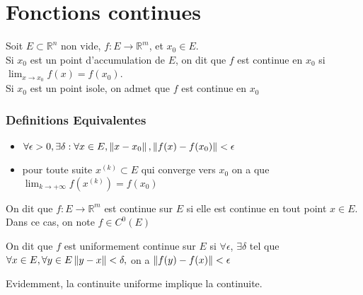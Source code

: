 \documentclass[../main.tex]{subfiles}
\begin{document}
\section{Fonctions continues}
\begin{defn}
	Soit $E \subset \mathbb{R}^n$ non vide, $f: E \to \mathbb{R}^{m}$, et $x_0 \in E$.\\
	Si $x_0$ est un point d'accumulation de $E$, on dit que $f$ est continue en $x_0$ si $\lim_{x \to x_0} f( x) = f( x_0) $.\\
	Si $x_0$ est un point isole, on admet que $f$ est continue en $x_{0}$
	
\end{defn}
\subsubsection{Definitions Equivalentes}

\begin{itemize}
	\item  $\forall \epsilon>0, \exists \delta: \forall x \in E, \left\lVert x-x_0\right\rVert, \left\lVert f( x) -f( x_0) \right\rVert<\epsilon$
	\item pour toute suite $x^{( k) }\subset E$ qui converge vers $x_{0}$ on a que $\lim_{k \to  + \infty} f( x^{( k) }) =f( x_{0}) $
\end{itemize}
\begin{defn}
	On dit que $f:E \to \mathbb{R}^m$ est continue sur $E$ si elle est continue en tout point $x\in E$.\\
	Dans ce cas, on note $f \in C^{0}( E) $
	
\end{defn}
\begin{defn}
	On dit que $f$ est uniformement continue sur $E$ si $\forall \epsilon$, $\exists \delta$ tel que $\forall x \in E, \forall y \in E \left\lVert y-x\right\rVert <\delta,$ on a $\left\lVert f( y) -f( x) \right\rVert<\epsilon$

\end{defn}
Evidemment, la continuite uniforme implique la continuite.
\end{document}
